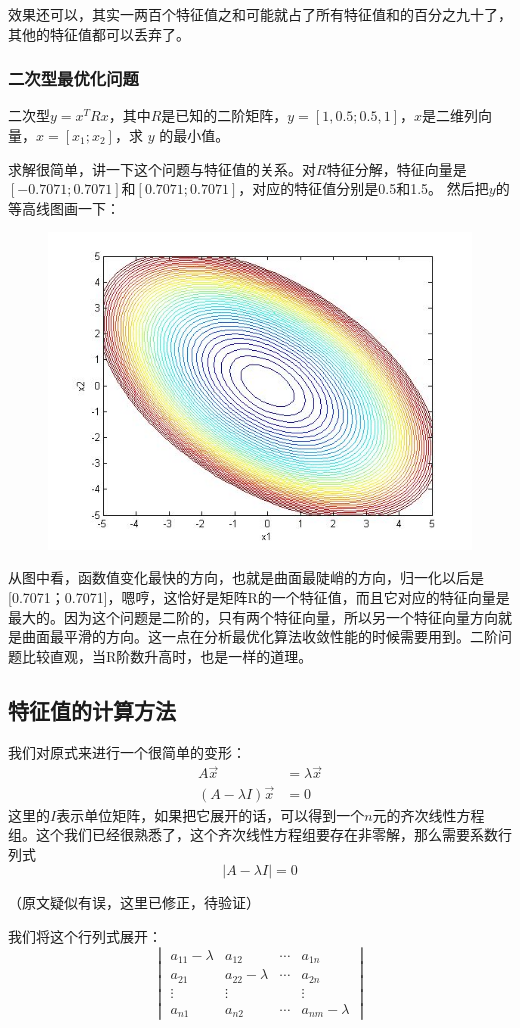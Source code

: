 \documentclass[12pt]{article}
\begin{document}
效果还可以，其实一两百个特征值之和可能就占了所有特征值和的百分之九十了，其他的特征值都可以丢弃了。

\subsubsection{二次型最优化问题}
二次型$y = x^TRx$，其中$R$是已知的二阶矩阵，$y = [1, 0.5;0.5, 1]$，$x$是二维列向量，$x=[x_1; x_2]$，求 $y$ 的最小值。

求解很简单，讲一下这个问题与特征值的关系。对$R$特征分解，特征向量是$[-0.7071;0.7071]$和$[0.7071;0.7071]$，对应的特征值分别是0.5和1.5。
然后把$y$的等高线图画一下：
\begin{figure}[H]
    \centering
    \includegraphics[width=.3\textwidth]{fig/UnderstandEigenValueVector_14.jpg}
\end{figure} 

从图中看，函数值变化最快的方向，也就是曲面最陡峭的方向，归一化以后是[0.7071；0.7071]，嗯哼，这恰好是矩阵R的一个特征值，而且它对应的特征向量是最大的。因为这个问题是二阶的，只有两个特征向量，所以另一个特征向量方向就是曲面最平滑的方向。这一点在分析最优化算法收敛性能的时候需要用到。二阶问题比较直观，当R阶数升高时，也是一样的道理。

\subsection{特征值的计算方法}
我们对原式来进行一个很简单的变形：
\begin{align*}
    A\vec{x} &= \lambda\vec{x} \\
    (A - \lambda I)\vec{x} &= 0
\end{align*}
这里的$I$表示单位矩阵，如果把它展开的话，可以得到一个$n$元的齐次线性方程组。这个我们已经很熟悉了，这个齐次线性方程组要存在非零解，那么需要系数行列式
$$
|A - \lambda I| = 0
$$

（原文疑似有误，这里已修正，待验证）

我们将这个行列式展开：
$$
\begin{vmatrix}
a_{11} - \lambda & a_{12} & \cdots & a_{1n} \\
a_{21} & a_{22} - \lambda & \cdots & a_{2n} \\
\vdots & \vdots & & \vdots \\
a_{n1} & a_{n2} & \cdots & a_{nm} - \lambda
\end{vmatrix}
$$
\end{document}
